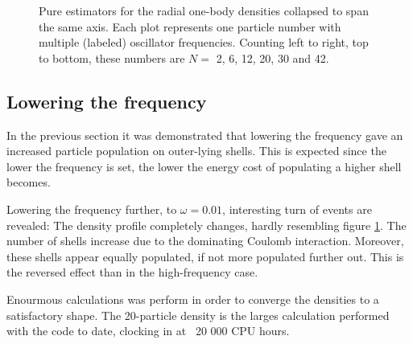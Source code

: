 \begin{figure}
\begin{center}
  \caption{Pure estimators for the radial one-body densities collapsed to span the same axis. Each plot represents one particle number with multiple (labeled) oscillator frequencies. Counting left to right, top to bottom, these numbers are $N=$ 2, 6, 12, 20, 30 and 42.}
  \label{fig:OBD_pure_collapsed}
 \end{center}
\end{figure}


\subsection{Lowering the frequency}

In the previous section it was demonstrated that lowering the frequency gave an increased particle population on outer-lying shells. This is expected since the lower the frequency is set, the lower the energy cost of populating a higher shell becomes.

Lowering the frequency further, to $\omega=0.01$, interesting turn of events are revealed: The density profile completely changes, hardly resembling figure \ref{fig:OBD_pure_collapsed}. The number of shells increase due to the dominating Coulomb interaction. Moreover, these shells appear equally populated, if not more populated further out. This is the reversed effect than in the high-frequency case.

Enourmous calculations was perform in order to converge the densities to a satisfactory shape. The 20-particle density is the larges calculation performed with the code to date, clocking in at ~20 000 CPU hours.


